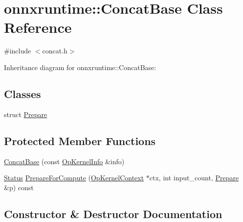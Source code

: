 \hypertarget{classonnxruntime_1_1ConcatBase}{}\section{onnxruntime\+:\+:Concat\+Base Class Reference}
\label{classonnxruntime_1_1ConcatBase}


{\ttfamily \#include $<$concat.\+h$>$}



Inheritance diagram for onnxruntime\+:\+:Concat\+Base\+:
\subsection*{Classes}
\begin{DoxyCompactItemize}
\item 
struct \mbox{\hyperlink{structonnxruntime_1_1ConcatBase_1_1Prepare}{Prepare}}
\end{DoxyCompactItemize}
\subsection*{Protected Member Functions}
\begin{DoxyCompactItemize}
\item 
\mbox{\hyperlink{classonnxruntime_1_1ConcatBase_ad51ee84cd557433fae4c949aa097e12b}{Concat\+Base}} (const \mbox{\hyperlink{classonnxruntime_1_1OpKernelInfo}{Op\+Kernel\+Info}} \&info)
\item 
\mbox{\hyperlink{classonnxruntime_1_1common_1_1Status}{Status}} \mbox{\hyperlink{classonnxruntime_1_1ConcatBase_aacc8230a44ffcf63ce47eefa1b1b2bc5}{Prepare\+For\+Compute}} (\mbox{\hyperlink{classonnxruntime_1_1OpKernelContext}{Op\+Kernel\+Context}} $\ast$ctx, int input\+\_\+count, \mbox{\hyperlink{structonnxruntime_1_1ConcatBase_1_1Prepare}{Prepare}} \&p) const
\end{DoxyCompactItemize}


\subsection{Constructor \& Destructor Documentation}
\mbox{\label{classonnxruntime_1_1ConcatBase_ad51ee84cd557433fae4c949aa097e12b}} 
